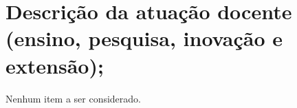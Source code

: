 \section[Descrição da atuação docente (ensino, pesquisa, inovação e extensão)]{Descrição da atuação docente (ensino, pesquisa, inovação e extensão);}

Nenhum item a ser considerado.